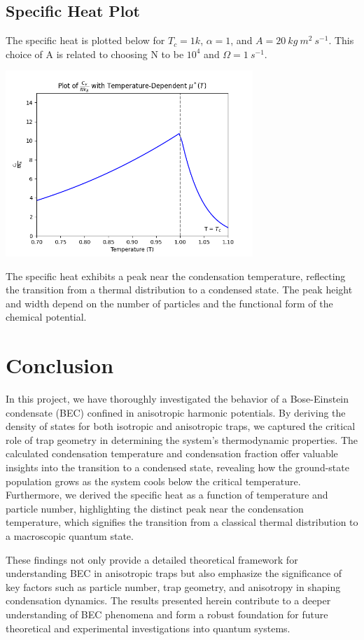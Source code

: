 \documentclass{article}
\numberwithin{equation}{section}
\numberwithin{equation}{subsection}
\begin{document}
\subsection{Specific Heat Plot}
The specific heat is plotted below for  $T_c = 1k$, $\alpha = 1$, and $A = 20\ kg\ m^2\ s^{-1}$. This choice of A is related to choosing N to be $10^{4}$ and $\Omega = 1\ s^{-1}$. 
\begin{center}
    \includegraphics[width=0.7\textwidth]{Figure_3.png}
\end{center}
The specific heat exhibits a peak near the condensation temperature, reflecting the transition from a thermal distribution to a condensed state. The peak height and width depend on the number of particles and the functional form of the chemical potential.
\newpage
\section{Conclusion}

In this project, we have thoroughly investigated the behavior of a Bose-Einstein condensate (BEC) confined in anisotropic harmonic potentials. By deriving the density of states for both isotropic and anisotropic traps, we captured the critical role of trap geometry in determining the system's thermodynamic properties. The calculated condensation temperature and condensation fraction offer valuable insights into the transition to a condensed state, revealing how the ground-state population grows as the system cools below the critical temperature. Furthermore, we derived the specific heat as a function of temperature and particle number, highlighting the distinct peak near the condensation temperature, which signifies the transition from a classical thermal distribution to a macroscopic quantum state.

These findings not only provide a detailed theoretical framework for understanding BEC in anisotropic traps but also emphasize the significance of key factors such as particle number, trap geometry, and anisotropy in shaping condensation dynamics. The results presented herein contribute to a deeper understanding of BEC phenomena and form a robust foundation for future theoretical and experimental investigations into quantum systems.
\end{document}

